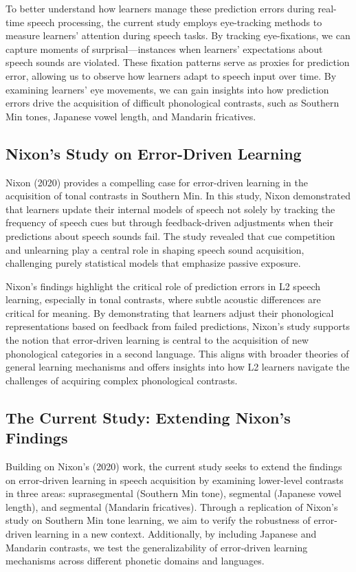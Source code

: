 To better understand how learners manage these prediction errors during real-time speech processing, the current study employs eye-tracking methods to measure learners' attention during speech tasks. By tracking eye-fixations, we can capture moments of surprisal—instances when learners' expectations about speech sounds are violated. These fixation patterns serve as proxies for prediction error, allowing us to observe how learners adapt to speech input over time. By examining learners' eye movements, we can gain insights into how prediction errors drive the acquisition of difficult phonological contrasts, such as Southern Min tones, Japanese vowel length, and Mandarin fricatives.

\subsection{Nixon’s Study on Error-Driven Learning}

Nixon (2020) provides a compelling case for error-driven learning in the acquisition of tonal contrasts in Southern Min. In this study, Nixon demonstrated that learners update their internal models of speech not solely by tracking the frequency of speech cues but through feedback-driven adjustments when their predictions about speech sounds fail. The study revealed that cue competition and unlearning play a central role in shaping speech sound acquisition, challenging purely statistical models that emphasize passive exposure.

Nixon's findings highlight the critical role of prediction errors in L2 speech learning, especially in tonal contrasts, where subtle acoustic differences are critical for meaning. By demonstrating that learners adjust their phonological representations based on feedback from failed predictions, Nixon's study supports the notion that error-driven learning is central to the acquisition of new phonological categories in a second language. This aligns with broader theories of general learning mechanisms and offers insights into how L2 learners navigate the challenges of acquiring complex phonological contrasts.

\subsection{The Current Study: Extending Nixon’s Findings}

Building on Nixon’s (2020) work, the current study seeks to extend the findings on error-driven learning in speech acquisition by examining lower-level contrasts in three areas: suprasegmental (Southern Min tone), segmental (Japanese vowel length), and segmental (Mandarin fricatives). Through a replication of Nixon’s study on Southern Min tone learning, we aim to verify the robustness of error-driven learning in a new context. Additionally, by including Japanese and Mandarin contrasts, we test the generalizability of error-driven learning mechanisms across different phonetic domains and languages.

